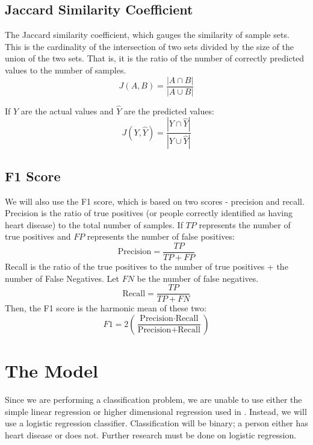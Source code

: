 \documentclass[letter]{article}
\begin{document}
\subsection{Jaccard Similarity Coefficient}
The Jaccard similarity coefficient, which gauges the similarity of sample sets.  This is the cardinality of the intersection of two sets divided by the size of the union of the two sets.  That is, it is the ratio of the number of correctly predicted values to the number of samples.
\begin{equation*}
	J(A,B) = \frac{|A \cap B|}{|A \cup B|}
\end{equation*}

If \(Y\) are the actual values and \(\hat Y\) are the predicted values:
\begin{equation}
	J(Y, \hat Y) = \frac{|Y \cap \hat Y|}{|Y \cup \hat Y|}
\end{equation}

\subsection{F1 Score}
We will also use the F1 score, which is based on two scores - precision and recall.  Precision is the ratio of true positives (or people correctly identified as having heart disease) to the total number of samples.  If \(TP\) represents the number of true positives and \(FP\) represents the number of false positives:
\begin{equation}
	\textrm{Precision} = \frac{TP}{TP + FP}
\end{equation}
Recall is the ratio of the true positives to the number of true positives + the number of False Negatives.  Let \(FN\) be the number of false negatives.
\begin{equation}
	\textrm{Recall} = \frac{TP}{TP+FN}
\end{equation}
Then, the F1 score is the harmonic mean of these two:
\begin{equation}
	F1=2 \left( \frac{\textrm{Precision} \cdot \textrm{Recall}}{\textrm{Precision} + \textrm{Recall}}\right)
\end{equation}

\section{The Model}
Since we are performing a classification problem, we are unable to use either the simple linear regression or higher dimensional regression used in
\citep{yoonsuhmulpred}.  Instead, we will use a logistic regression classifier.  Classification will be binary; a person either has heart disease or does not.  Further research must be done on logistic regression.
\end{document}
